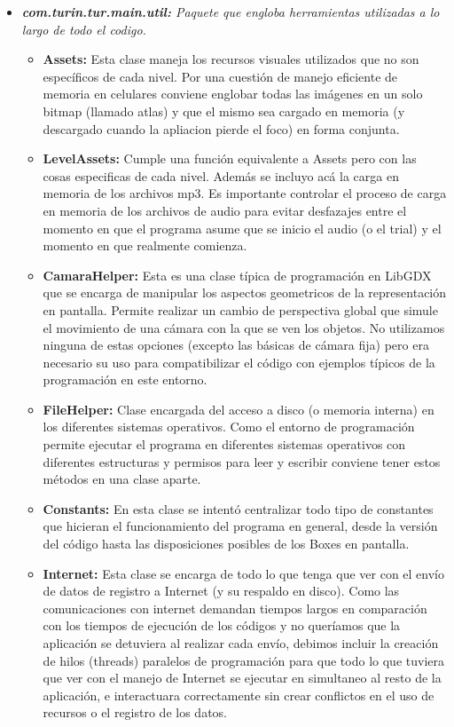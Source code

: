 \documentclass{article}
\numberwithin{figure}{section}
\begin{document}
\begin{itemize}
        \item \textit{\textbf{com.turin.tur.main.util:} Paquete que engloba herramientas utilizadas a lo largo de todo el codigo.}
        \begin{itemize}
            \item \textbf{Assets:} Esta clase maneja los recursos visuales utilizados que no son específicos de cada nivel. Por una cuestión de manejo eficiente de memoria en celulares conviene englobar todas las imágenes en un solo bitmap (llamado atlas) y que el mismo sea cargado en memoria (y descargado cuando la apliacion pierde el foco) en forma conjunta.
            \item \textbf{LevelAssets:} Cumple una función equivalente a Assets pero con las cosas especificas de cada nivel. Además se incluyo acá la carga en memoria de los archivos mp3. Es importante controlar el proceso de carga en memoria de los archivos de audio para evitar desfazajes entre el momento en que el programa asume que se inicio el audio (o el trial) y el momento en que realmente comienza.
            \item \textbf{CamaraHelper:} Esta es una clase típica de programación en LibGDX que se encarga de manipular los aspectos geometricos de la representación en pantalla. Permite realizar un cambio de perspectiva global que simule el movimiento de una cámara con la que se ven los objetos. No utilizamos ninguna de estas opciones (excepto las básicas de cámara fija) pero era necesario su uso para compatibilizar el código con ejemplos típicos de la programación en este entorno.
            \item \textbf{FileHelper:} Clase encargada del acceso a disco (o memoria interna) en los diferentes sistemas operativos. Como el entorno de programación permite ejecutar el programa en diferentes sistemas operativos con diferentes estructuras y permisos para leer y escribir conviene tener estos métodos en una clase aparte. 
            \item \textbf{Constants:} En esta clase se intentó centralizar todo tipo de constantes que hicieran el funcionamiento del programa en general, desde la versión del código hasta las disposiciones posibles de los Boxes en pantalla. 
            \item \textbf{Internet:} Esta clase se encarga de todo lo que tenga que ver con el envío de datos de registro a Internet (y su respaldo en disco). Como las comunicaciones con internet demandan tiempos largos en comparación con los tiempos de ejecución de los códigos y no queríamos que la aplicación se detuviera al realizar cada envío, debimos incluir la creación de hilos (threads) paralelos de programación para que todo lo que tuviera que ver con el manejo de Internet se ejecutar en simultaneo al resto de la aplicación, e interactuara correctamente sin crear conflictos en el uso de recursos o el registro de los datos.
        \end{itemize}
        

\end{itemize}
\end{document}
